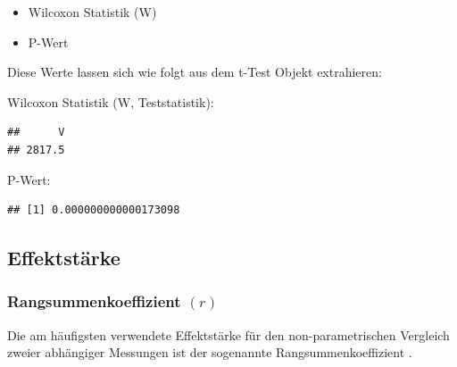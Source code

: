 \documentclass[
]{book}
\newenvironment{Shaded}{\begin{snugshade}}{\end{snugshade}}
\newcommand{\AttributeTok}[1]{\textcolor[rgb]{0.77,0.63,0.00}{#1}}
\newcommand{\FunctionTok}[1]{\textcolor[rgb]{0.00,0.00,0.00}{#1}}
\newcommand{\NormalTok}[1]{#1}
\newcommand{\SpecialCharTok}[1]{\textcolor[rgb]{0.00,0.00,0.00}{#1}}
\providecommand{\tightlist}{%
  \setlength{\itemsep}{0pt}\setlength{\parskip}{0pt}}
\begin{document}
\begin{itemize}
\tightlist
\item
  Wilcoxon Statistik (W)
\item
  P-Wert
\end{itemize}

Diese Werte lassen sich wie folgt aus dem t-Test Objekt extrahieren:

Wilcoxon Statistik (W, Teststatistik):

\begin{Shaded}
\end{Shaded}

\begin{verbatim}
##      V 
## 2817.5
\end{verbatim}

P-Wert:

\begin{Shaded}
\end{Shaded}

\begin{verbatim}
## [1] 0.000000000000173098
\end{verbatim}

\hypertarget{effektstuxe4rke-4}{%
\subsection{Effektstärke}\label{effektstuxe4rke-4}}

\hypertarget{rangsummenkoeffizient-r-1}{%
\subsubsection{\texorpdfstring{Rangsummenkoeffizient \((r)\)}{Rangsummenkoeffizient (r)}}\label{rangsummenkoeffizient-r-1}}

Die am häufigsten verwendete Effektstärke für den non-parametrischen Vergleich zweier abhängiger Messungen ist der sogenannte Rangsummenkoeffizient \citet{tomczak2014need}.
\end{document}

